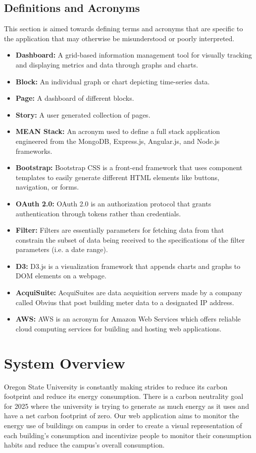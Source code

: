 \documentclass[journal,10pt,onecolumn,compsoc]{IEEEtran}
\begin{document}
    \subsection{Definitions and Acronyms}
    This section is aimed towards defining terms and acronyms that are specific to the application that may otherwise be misunderstood or poorly interpreted.
    \begin{itemize}
        \item \textbf{Dashboard:}
            A grid-based information management tool for visually tracking and displaying metrics and data through graphs and charts.
        \item \textbf{Block:} 
            An individual graph or chart depicting time-series data.
        \item \textbf{Page:} 
            A dashboard of different blocks. 
        \item \textbf{Story:} 
            A user generated collection of pages. 
        \item \textbf{MEAN Stack:} 
            An acronym used to define a full stack application engineered from the MongoDB, Express.js, Angular.js, and Node.js frameworks. 
        \item \textbf{Bootstrap:} 
            Bootstrap CSS is a front-end framework that uses component templates to easily generate different HTML elements like buttons, navigation, or forms. 
        \item \textbf{OAuth 2.0:} 
            OAuth 2.0 is an authorization protocol that grants authentication through tokens rather than credentials. 
        \item \textbf{Filter:} 
            Filters are essentially parameters for fetching data from that constrain the subset of data being received to the specifications of the filter parameters (i.e. a date range). 
        \item \textbf{D3:} 
            D3.js is a visualization framework that appends charts and graphs to DOM elements on a webpage. 
        \item \textbf{AcquiSuite:} 
            AcquiSuites are data acquisition servers made by a company called Obvius that post building meter data to a designated IP address.
        \item \textbf{AWS:} 
            AWS is an acronym for Amazon Web Services which offers reliable cloud computing services for building and hosting web applications.
    \end{itemize}
    \section{System Overview} 
    Oregon State University is constantly making strides to reduce its carbon footprint and reduce its energy consumption. There is a carbon neutrality goal for 2025 where the university is trying to generate as much energy as it uses and have a net carbon footprint of zero. Our web application aims to monitor the energy use of buildings on campus in order to create a visual representation of each building's consumption and incentivize people to monitor their consumption habits and reduce the campus's overall consumption.
\end{document}
